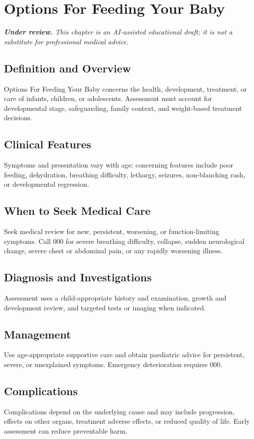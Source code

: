 \chapter{Options For Feeding Your Baby}

\medskip
\noindent\textit{\textbf{Under review.} This chapter is an AI-assisted educational draft; it is not a substitute for professional medical advice.}

\section*{Definition and Overview}
Options For Feeding Your Baby concerns the health, development, treatment, or care of infants, children, or adolescents. Assessment must account for developmental stage, safeguarding, family context, and weight-based treatment decisions.

\section*{Clinical Features}
Symptoms and presentation vary with age; concerning features include poor feeding, dehydration, breathing difficulty, lethargy, seizures, non-blanching rash, or developmental regression.

\section*{When to Seek Medical Care}
Seek medical review for new, persistent, worsening, or function-limiting symptoms. Call 000 for severe breathing difficulty, collapse, sudden neurological change, severe chest or abdominal pain, or any rapidly worsening illness.

\section*{Diagnosis and Investigations}
Assessment uses a child-appropriate history and examination, growth and development review, and targeted tests or imaging when indicated.

\section*{Management}
Use age-appropriate supportive care and obtain paediatric advice for persistent, severe, or unexplained symptoms. Emergency deterioration requires 000.

\section*{Complications}
Complications depend on the underlying cause and may include progression, effects on other organs, treatment adverse effects, or reduced quality of life. Early assessment can reduce preventable harm.

